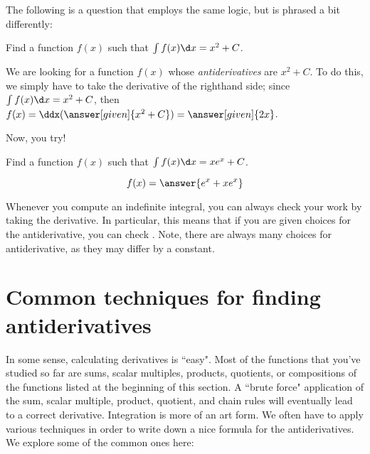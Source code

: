 \documentclass[nooutcomes]{ximera}
\begin{document}
The following is a question that employs the same logic, but is phrased a bit differently:

\begin{example}
  Find a function $f(x)$ such that $\int f(x) \d x = x^2 +C$.
  
  \begin{explanation}
    We are looking for a function $f(x)$ whose \emph{antiderivatives} are $x^2+C$.  To do this, we simply have to take the derivative of the righthand side; since $\int f(x) \d x =x^2+C$, then $f(x) = \ddx(\answer[given]{x^2+C}) =\answer[given]{2x}$.
    
    \end{explanation}
\end{example}

Now, you try!

\begin{question} 
  Find a function $f(x)$ such that $\int f(x) \d x = xe^x +C$.

  \begin{prompt} 
    \[
    f(x) = \answer{e^x + xe^x}
    \]
  \end{prompt}
\end{question}

Whenever you compute an indefinite integral, you can always check your
work by taking the derivative. In particular, this means that if you
are given choices for the antiderivative, you can check . Note, there are always many choices for
antiderivative, as they may differ by a constant.



\section{Common techniques for finding antiderivatives}
In some sense, calculating derivatives is ``easy".  Most of the functions that you've studied so far are sums, scalar multiples, products, quotients, or compositions of the functions listed at the beginning of this section.  A ``brute force" application of the sum, scalar multiple, product, quotient, and chain rules will eventually lead to a correct derivative.  Integration is more of an art form.  We often have to apply various techniques in order to write down a nice formula for the antiderivatives. We explore some of the common ones here:
\end{document}

